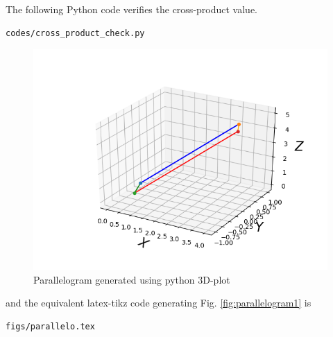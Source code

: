 \begin{enumerate}[label=\thesection.\arabic*.,ref=\thesection.\theenumi]
The  following Python code verifies the cross-product value.

\begin{lstlisting}
codes/cross_product_check.py
\end{lstlisting}

\begin{figure}[!ht]
\centering
\includegraphics[width=\columnwidth]{./figs/parallelogram.png}
\caption{Parallelogram generated using python 3D-plot}
\label{fig:paral_sss_py}
\end{figure}

%
and the equivalent latex-tikz code generating Fig. \ref{fig:parallelogram1} is 
\begin{lstlisting}
figs/parallelo.tex
\end{lstlisting}
%

%

%

%
%

\end{enumerate}


